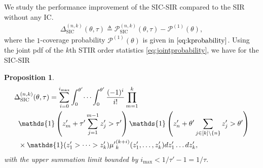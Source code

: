 \documentclass[lettersize,journal]{IEEEtran}
\newtheorem{prop}[theorem]{Proposition}
\begin{document}
We study the performance improvement of the SIC-SIR compared to the SIR without any IC.
\begin{align}
  \label{DeltSICIIC}
  \Delta^{(n,k)}_{\text{SIC}}(\theta,\tau) \triangleq \mathcal{P}^{(n,k)}_{\text{SIC}}(\theta,\tau)- \mathcal{P}^{(1)}(\theta),
\end{align}
where the $1$-coverage probability  $\mathcal{P}^{(1)}(\theta)$ is given in $\eqref{eq:kprobability}$. Using the joint pdf of the $k$th STIR order statistics \eqref{eq:jointprobability}, we have for the SIC-SIR
\begin{prop}
  \begin{align}
    \label{eq:SICprob}
    & \Delta^{(n,k)}_{\text{SIC}}(\theta,\tau) =\sum^{i_{\text{max}}}_{i=0} \int_{0}^{\theta'} \dots \int_{0}^{\theta'}\frac{(-1)^i}{i!}\prod_{m=1}^k\nonumber \\
    &\hspace{0.2cm} \mathds{1}\left( z'_m+ \tau'\sum_{j=1}^{m-1} z'_j>\tau' \right)  \mathds{1}\left(z'_n+  \theta'\sum_{j\in [k] \setminus \{n\}} z'_j>\theta' \right) \nonumber \\
    & \hspace{0.2cm}\times \mathds{1}(z'_1>\dots>z'_k){\mu'}_k^{(k+i)}(z'_1,\dots,z'_k) d z'_1 \dots d z'_k,
  \end{align}
  with the upper summation limit bounded by $i_{\text{max}} < 1/\tau'-1=1/\tau.$ 




\end{prop}
\end{document}
